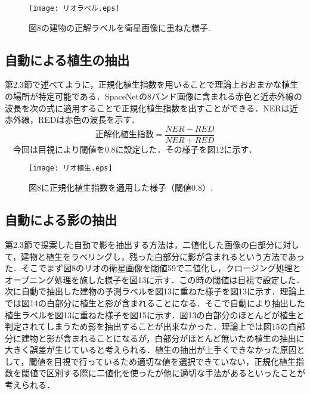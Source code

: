 \documentclass[a4j,twoside,twocolumn]{jarticle}
\begin{document}
\begin{figure}[t]
  \begin{center}
    \texttt{[image: リオラベル.eps]}
    \caption{図8の建物の正解ラベルを衛星画像に重ねた様子.}
    \label{fig11}
  \end{center}
\end{figure}

\subsection{自動による植生の抽出}
第2.3節で述べてように，正規化植生指数を用いることで理論上おおまかな植生の場所が特定可能である．SpaceNetの8バンド画像に含まれる赤色と近赤外線の波長を次の式に適用することで正規化植生指数を出すことができる．NERは近赤外線，REDは赤色の波長を示す．\\
\begin{equation}
正解化植生指数 = \frac{NER - RED}{NER + RED}
\end{equation} 
　今回は目視により閾値を0.8に設定した．その様子を図12に示す．\\

\begin{figure}[t]
  \begin{center}
    \texttt{[image: リオ植生.eps]}
    \caption{図8に正規化植生指数を適用した様子（閾値0.8）.}
    \label{fig12}
  \end{center}
\end{figure}

\subsection{自動による影の抽出}
第2.3節で提案した自動で影を抽出する方法は，二値化した画像の白部分に対して，建物と植生をラベリングし，残った白部分に影が含まれるという方法であった．そこでまず図8のリオの衛星画像を閾値59で二値化し，クロージング処理とオープニング処理を施した様子を図13に示す．この時の閾値は目視で設定した．次に自動で抽出した建物の予測ラベルを図13に重ねた様子を図13に示す．理論上では図14の白部分に植生と影が含まれることになる．そこで自動により抽出した植生ラベルを図13に重ねた様子を図15に示す．図13の白部分のほとんどが植生と判定されてしまうため影を抽出することが出来なかった．理論上では図15の白部分に建物と影が含まれることになるが，白部分がほとんど無いため植生の抽出に大きく誤差が生じていると考えられる．植生の抽出が上手くできなかった原因として，閾値を目視で行っているため適切な値を選択できていない，正規化植生指数を閾値で区別する際に二値化を使ったが他に適切な手法があるといったことが考えられる．\\
\end{document}
